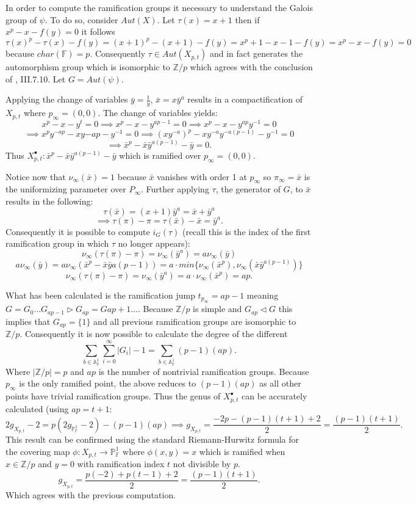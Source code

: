 \documentclass[paper=a4, fontsize=11pt]{scrartcl} %
\numberwithin{equation}{section} %
\numberwithin{figure}{section} %
\numberwithin{table}{section} %
\theoremstyle{break}
\begin{document}
In order to compute the ramification groups it necessary to understand the Galois group of $\psi$. To do so, consider $Aut(X)$. Let $\tau(x)=x+1$ then if $x^p - x - f(y) = 0$ it follows
$$
\tau(x)^p - \tau(x) - f(y) = (x+1)^p - (x+1) - f(y) = x^p + 1 - x - 1 - f(y) = x^p-x-f(y) = 0
$$
because $char(\mathbb{F})=p$. Consequently $\tau\in Aut(X_{p,t})$ and in fact generates the automorphism group which is isomorphic to $\mathbb{Z}/p$ which agrees with the conclusion of \cite{stitchenoth}, III.7.10. Let $G=Aut(\psi)$.

Applying the change of variables $\bar{y}=\frac{1}{y}$, $\bar{x}=x\bar{y}^a$ results in a compactification of $X_{p,t}$ where $p_\infty = (0,0)$. The change of variables yields:
$$x^p-x-y^t = 0 \implies x^p-x-y^{ap-1}=0 \implies x^p-x-y^{ap}y^{-1}=0 $$
$$\implies x^p y^{-ap} -xy{-ap}-y^{-1}=0 \implies (xy^{-a})^p - xy^{-a}y^{-a(p-1)}-y^{-1}=0 $$
$$\implies \bar{x}^p-\bar{x}\bar{y}^{a(p-1)}-\bar{y} = 0.$$
Thus $X^{\bullet}_{p,t}: \bar{x}^p-\bar{x}\bar{y}^{a(p-1)}-\bar{y}$ which is ramified over $p_\infty = (0,0)$.

Notice now that $\nu_\infty(\bar{x}) = 1$ because $\bar{x}$ vanishes with order 1 at $p_\infty$ so $\pi_\infty = \bar{x}$ is the uniformizing parameter over $P_\infty$. Further applying $\tau$, the generator of $G$, to $\bar{x}$ results in the following:
$$\tau(\bar{x}) = (x+1)\bar{y}^a = \bar{x} + \bar{y}^a$$
$$\implies \tau(\pi)-\pi =  \tau(\bar{x}) - \bar{x} = \bar{y}^a.$$
Consequently it is possible to compute $i_G(\tau)$ (recall this is the index of the first ramification group in which $\tau$ no longer appears):
$$\nu_\infty(\tau(\pi)-\pi) = \nu_\infty(\bar{y}^a)=a\nu_\infty(\bar{y})$$
$$a\nu_\infty(\bar{y})=a\nu_\infty(\bar{x}^p - \bar{x}\bar{y}{a(p-1)})=a\cdot min\{\nu_\infty(\bar{x}^p),\nu_\infty(\bar{x}\bar{y}^{a(p-1)})\}$$
$$\nu_\infty(\tau(\pi)-\pi) = \nu_\infty(\bar{y}^a) = a\cdot\nu_\infty(\bar{x}^p)=ap.$$

What has been calculated is the ramification jump $t_{p_\infty} = ap-1$ meaning $G = G_0 \ldots G_{ap-1} \triangleright G_{ap} = G{ap+1}\ldots$. Because $\mathbb{Z}/p$ is simple and $G_{ap} \triangleleft G$ this implies that $G_{ap} = \{1\}$ and all previous ramification groups are isomorphic to $\mathbb{Z}/p$. Consequently it is now possible to calculate the degree of the different
$$
\sum_{b\in\mathbb{A}^1_\mathbb{F}} \sum_{i=0}^\infty |G_i| - 1 = \sum_{b\in\mathbb{A}^1_\mathbb{F}} (p-1)(ap).
$$
Where $|\mathbb{Z}/p|=p$ and $ap$ is the number of nontrivial ramification groups. Because $p_\infty$ is the only ramified point, the above reduces to $(p-1)(ap)$ as all other points have trivial ramification groups. Thus the genus of $X^\bullet_{p,t}$ can be accurately calculated (using $ap=t+1$:
$$
2g_{X_{p,t}} -2= p(2g_{\mathbb{P}^1_{\mathbb{F}}} -2) - (p-1)(ap) \implies  g_{X_{p,t}} = \frac{-2p-(p-1)(t+1)+2}{2}=\frac{(p-1)(t+1)}{2}.
$$
This result can be confirmed using the standard Riemann-Hurwitz formula for the covering map $\phi:X_{p,t} \to \mathbb{P}_\mathbb{F}^1$ where $\phi(x,y)=x$ which is ramified when $x\in \mathbb{Z}/p$ and $y=0$ with ramification index $t$ not divisible by $p$.
$$
g_{X_{p,t}} = \frac{p(-2) + p(t-1) +2}{2} = \frac{(p-1)(t+1)}{2}.
$$
Which agrees with the previous computation.
\clearpage
\printbibliography
\end{document}
